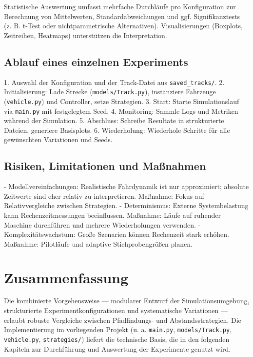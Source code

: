 Statistische Auswertung umfasst mehrfache Durchläufe pro Konfiguration zur Berechnung von Mittelwerten, Standardabweichungen und ggf. Signifikanztests (z. B. t-Test oder nichtparametrische Alternativen). Visualisierungen (Boxplots, Zeitreihen, Heatmaps) unterstützen die Interpretation.

\subsection*{Ablauf eines einzelnen Experiments}
1. Auswahl der Konfiguration und der Track-Datei aus \texttt{saved\_tracks/}.
2. Initialisierung: Lade Strecke (\texttt{models/Track.py}), instanziere Fahrzeuge (\texttt{vehicle.py}) und Controller, setze Strategien.
3. Start: Starte Simulationslauf via \texttt{main.py} mit festgelegtem Seed.
4. Monitoring: Sammle Logs und Metriken während der Simulation.
5. Abschluss: Schreibe Resultate in strukturierte Dateien, generiere Basisplots.
6. Wiederholung: Wiederhole Schritte für alle gewünschten Variationen und Seeds.

\subsection*{Risiken, Limitationen und Maßnahmen}
- Modellvereinfachungen: Realistische Fahrdynamik ist nur approximiert; absolute Zeitwerte sind eher relativ zu interpretieren. Maßnahme: Fokus auf Relativvergleiche zwischen Strategien.
- Determinismus: Externe Systembelastung kann Rechenzeitmessungen beeinflussen. Maßnahme: Läufe auf ruhender Maschine durchführen und mehrere Wiederholungen verwenden.
- Komplexitätswachstum: Große Szenarien können Rechenzeit stark erhöhen. Maßnahme: Pilotläufe und adaptive Stichprobengrößen planen.

\section*{Zusammenfassung}
Die kombinierte Vorgehensweise — modularer Entwurf der Simulationsumgebung, strukturierte Experimentkonfigurationen und systematische Variationen — erlaubt robuste Vergleiche zwischen Pfadfindungs- und Abstandsstrategien. Die Implementierung im vorliegenden Projekt (u. a. \texttt{main.py}, \texttt{models/Track.py}, \texttt{vehicle.py}, \texttt{strategies/}) liefert die technische Basis, die in den folgenden Kapiteln zur Durchführung und Auswertung der Experimente genutzt wird.

